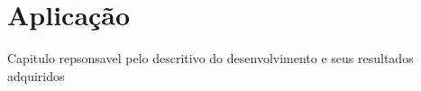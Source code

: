 \chapter{Aplicação} \label{cap:resultados}
 
Capitulo repsonsavel pelo descritivo do desenvolvimento e seus resultados adquiridos



